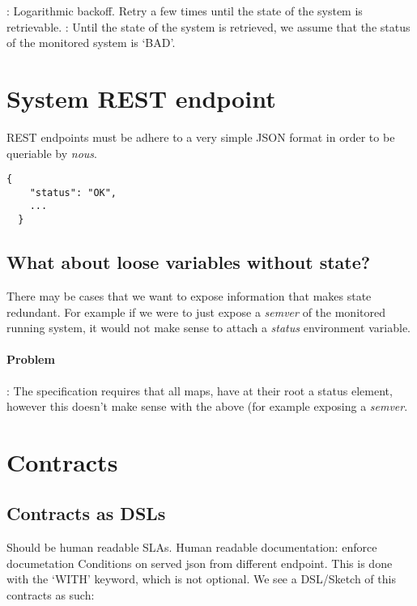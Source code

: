 \documentclass[12pt,twoside]{article}
\newcommand{\projectname}[0]{\textit{nous}}
\begin{document}
\begin{itemize}
  : Logarithmic backoff. Retry a few times until the
    state of the system is retrievable.
  : Until the state of the system is retrieved, we
    assume that the status of the monitored system is `BAD'.
\end{itemize}

\section{System REST endpoint}
REST endpoints must be adhere to a very simple JSON format in order to
be queriable by \projectname.
\begin{lstlisting}[caption='Sample REST endpoint]
  {
    "status": "OK",
    ...
  }
\end{lstlisting}

\subsection{What about loose variables without state?}
There may be cases that we want to expose information that makes state
redundant. For example if we were to just expose a \textit{semver} of
the monitored running system, it would not make sense to attach a
\textit{status} environment variable.

\paragraph{Problem}: The specification requires that all maps, have at
their root a status element, however this doesn't make sense with the
above (for example exposing a \textit{semver}.

\section{Contracts}
\subsection{Contracts as DSLs}
Should be human readable SLAs. Human readable documentation: enforce
documetation Conditions on served json from different endpoint. This
is done with the `WITH' keyword, which is not optional. We see a
DSL/Sketch of this contracts as such:
\end{document}
